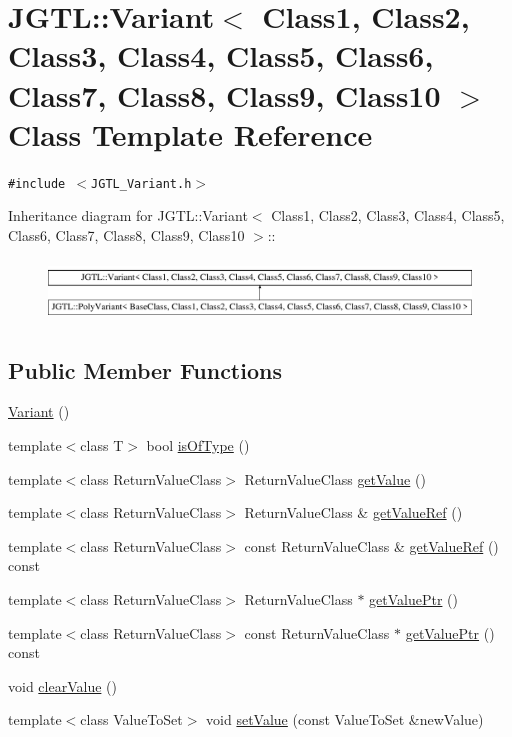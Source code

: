 \hypertarget{class_j_g_t_l_1_1_variant}{
\section{JGTL::Variant$<$ Class1, Class2, Class3, Class4, Class5, Class6, Class7, Class8, Class9, Class10 $>$ Class Template Reference}
\label{class_j_g_t_l_1_1_variant}
}
{\tt \#include $<$JGTL\_\-Variant.h$>$}

Inheritance diagram for JGTL::Variant$<$ Class1, Class2, Class3, Class4, Class5, Class6, Class7, Class8, Class9, Class10 $>$::\begin{figure}[H]
\begin{center}
\leavevmode
\includegraphics[height=1.64223cm]{class_j_g_t_l_1_1_variant}
\end{center}
\end{figure}
\subsection*{Public Member Functions}
\begin{CompactItemize}
\item 
\hyperlink{class_j_g_t_l_1_1_variant_c3e3ced5f3f7ad56b04f44a2c8661aa7}{Variant} ()
\item 
template$<$class T$>$ bool \hyperlink{class_j_g_t_l_1_1_variant_6fe19e740be4b46f6e9ff7cfc5c380db}{is\-Of\-Type} ()
\item 
template$<$class Return\-Value\-Class$>$ Return\-Value\-Class \hyperlink{class_j_g_t_l_1_1_variant_abc5e046158a10009195be7b4e93a6b3}{get\-Value} ()
\item 
template$<$class Return\-Value\-Class$>$ Return\-Value\-Class \& \hyperlink{class_j_g_t_l_1_1_variant_f2670c64307942a4e8f8b363f1adcd5c}{get\-Value\-Ref} ()
\item 
template$<$class Return\-Value\-Class$>$ const Return\-Value\-Class \& \hyperlink{class_j_g_t_l_1_1_variant_7c70b26989ee3f2ba097770da10533c9}{get\-Value\-Ref} () const
\item 
template$<$class Return\-Value\-Class$>$ Return\-Value\-Class $\ast$ \hyperlink{class_j_g_t_l_1_1_variant_e54d779f27e151cc64ccaeef995707e1}{get\-Value\-Ptr} ()
\item 
template$<$class Return\-Value\-Class$>$ const Return\-Value\-Class $\ast$ \hyperlink{class_j_g_t_l_1_1_variant_2950e4b7623f5a22640f75359248f999}{get\-Value\-Ptr} () const
\item 
void \hyperlink{class_j_g_t_l_1_1_variant_ea78e1f4b455e101c2ab426ab23a8b15}{clear\-Value} ()
\item 
template$<$class Value\-To\-Set$>$ void \hyperlink{class_j_g_t_l_1_1_variant_c909cf061197467573f89b74014da76d}{set\-Value} (const Value\-To\-Set \&new\-Value)
\end{CompactItemize}
